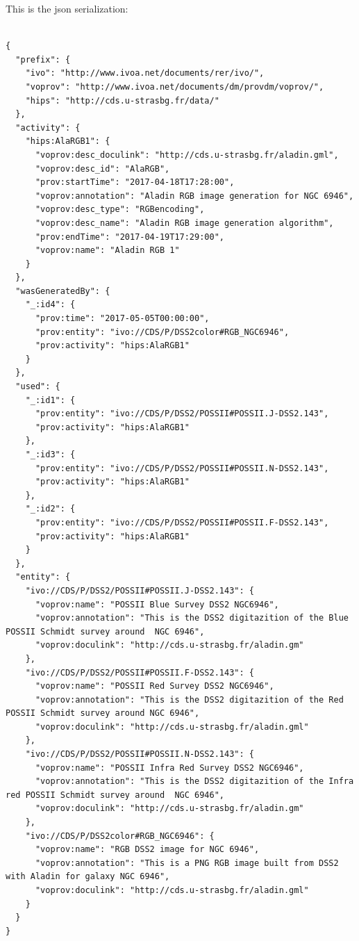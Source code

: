 This is the json serialization:

\begin{verbatim}

{
  "prefix": {
    "ivo": "http://www.ivoa.net/documents/rer/ivo/",
    "voprov": "http://www.ivoa.net/documents/dm/provdm/voprov/",
    "hips": "http://cds.u-strasbg.fr/data/"
  },
  "activity": {
    "hips:AlaRGB1": {
      "voprov:desc_doculink": "http://cds.u-strasbg.fr/aladin.gml",
      "voprov:desc_id": "AlaRGB",
      "prov:startTime": "2017-04-18T17:28:00",
      "voprov:annotation": "Aladin RGB image generation for NGC 6946",
      "voprov:desc_type": "RGBencoding",
      "voprov:desc_name": "Aladin RGB image generation algorithm",
      "prov:endTime": "2017-04-19T17:29:00",
      "voprov:name": "Aladin RGB 1"
    }
  },
  "wasGeneratedBy": {
    "_:id4": {
      "prov:time": "2017-05-05T00:00:00",
      "prov:entity": "ivo://CDS/P/DSS2color#RGB_NGC6946",
      "prov:activity": "hips:AlaRGB1"
    }
  },
  "used": {
    "_:id1": {
      "prov:entity": "ivo://CDS/P/DSS2/POSSII#POSSII.J-DSS2.143",
      "prov:activity": "hips:AlaRGB1"
    },
    "_:id3": {
      "prov:entity": "ivo://CDS/P/DSS2/POSSII#POSSII.N-DSS2.143",
      "prov:activity": "hips:AlaRGB1"
    },
    "_:id2": {
      "prov:entity": "ivo://CDS/P/DSS2/POSSII#POSSII.F-DSS2.143",
      "prov:activity": "hips:AlaRGB1"
    }
  },
  "entity": {
    "ivo://CDS/P/DSS2/POSSII#POSSII.J-DSS2.143": {
      "voprov:name": "POSSII Blue Survey DSS2 NGC6946",
      "voprov:annotation": "This is the DSS2 digitazition of the Blue POSSII Schmidt survey around  NGC 6946",
      "voprov:doculink": "http://cds.u-strasbg.fr/aladin.gm"
    },
    "ivo://CDS/P/DSS2/POSSII#POSSII.F-DSS2.143": {
      "voprov:name": "POSSII Red Survey DSS2 NGC6946",
      "voprov:annotation": "This is the DSS2 digitazition of the Red POSSII Schmidt survey around NGC 6946",
      "voprov:doculink": "http://cds.u-strasbg.fr/aladin.gml"
    },
    "ivo://CDS/P/DSS2/POSSII#POSSII.N-DSS2.143": {
      "voprov:name": "POSSII Infra Red Survey DSS2 NGC6946",
      "voprov:annotation": "This is the DSS2 digitazition of the Infra red POSSII Schmidt survey around  NGC 6946",
      "voprov:doculink": "http://cds.u-strasbg.fr/aladin.gm"
    },
    "ivo://CDS/P/DSS2color#RGB_NGC6946": {
      "voprov:name": "RGB DSS2 image for NGC 6946",
      "voprov:annotation": "This is a PNG RGB image built from DSS2 with Aladin for galaxy NGC 6946",
      "voprov:doculink": "http://cds.u-strasbg.fr/aladin.gml"
    }
  }
}

\end{verbatim}

